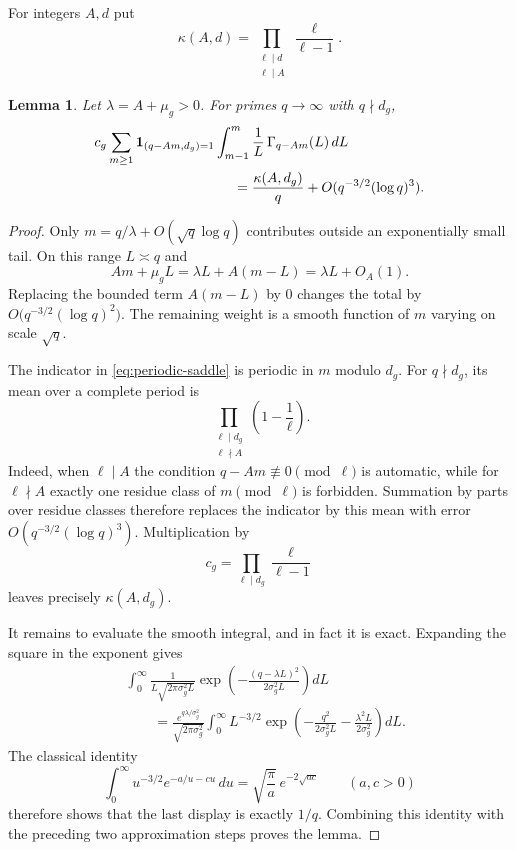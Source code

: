 \documentclass[11pt,reqno]{amsart}
\theoremstyle{plain}
\newtheorem{lemma}[theorem]{Lemma}
\theoremstyle{definition}
\newcommand{\1}{\mathbf 1}
\begin{document}
For integers $A,d$ put
\begin{equation}\label{eq:kappa-Ad}
 \kappa(A,d)=\prod_{\substack{\ell\mid d\\\ell\mid A}}
 \frac{\ell}{\ell-1}.
\end{equation}

\begin{lemma}\label{lem:periodic-saddle}
Let $\lambda=A+\mu_g>0$.  For primes $q\to\infty$ with $q\nmid d_g$,
\begin{equation}\label{eq:periodic-saddle}
\begin{split}
 &c_g\sum_{m\ge1}\1_{(q-Am,d_g)=1}
 \int_{m-1}^m\frac1L\,\Gamma_{q-Am}(L)\,dL\\
 &\hspace{35mm}=\frac{\kappa(A,d_g)}q+O(q^{-3/2}(\log q)^3).
\end{split}
\end{equation}
\end{lemma}

\begin{proof}
Only $m=q/\lambda+O(\sqrt q\log q)$ contributes outside an exponentially small tail.  On this range $L\asymp q$ and
\[
 Am+\mu_gL=\lambda L+A(m-L)=\lambda L+O_A(1).
\]
Replacing the bounded term $A(m-L)$ by $0$ changes the total by
$O\big(q^{-3/2}(\log q)^2\big)$.
The remaining weight is a smooth function of $m$ varying on scale $\sqrt q$.

The indicator in \eqref{eq:periodic-saddle} is periodic in $m$ modulo $d_g$.  For $q\nmid d_g$, its mean over a complete period is
\[
 \prod_{\substack{\ell\mid d_g\\\ell\nmid A}}
 \left(1-\frac1\ell\right).
\]
Indeed, when $\ell\mid A$ the condition $q-Am\not\equiv0\pmod\ell$ is automatic, while for $\ell\nmid A$ exactly one residue class of $m\pmod\ell$ is forbidden.  Summation by parts over residue classes therefore replaces the indicator by this mean with error $O(q^{-3/2}(\log q)^3)$.  Multiplication by
\[
 c_g=\prod_{\ell\mid d_g}\frac\ell{\ell-1}
\]
leaves precisely $\kappa(A,d_g)$.

It remains to evaluate the smooth integral, and in fact it is exact.  Expanding the square in the exponent gives
\begin{align*}
 &\int_0^\infty\frac1{L\sqrt{2\pi\sigma_g^2L}}
 \exp\left(-\frac{(q-\lambda L)^2}{2\sigma_g^2L}\right)dL\\
 &\qquad=\frac{e^{q\lambda/\sigma_g^2}}{\sqrt{2\pi\sigma_g^2}}
 \int_0^\infty L^{-3/2}
 \exp\left(-\frac{q^2}{2\sigma_g^2L}-\frac{\lambda^2L}{2\sigma_g^2}\right)dL.
\end{align*}
The classical identity
\[
 \int_0^\infty u^{-3/2}e^{-a/u-cu}\,du
 =\sqrt{\frac\pi a}\,e^{-2\sqrt{ac}}\qquad(a,c>0)
\]
therefore shows that the last display is exactly $1/q$.  Combining this identity with the preceding two approximation steps proves the lemma.
\end{proof}
\end{document}
